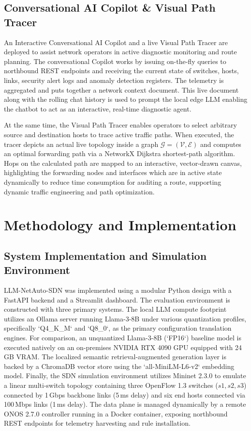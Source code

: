 \documentclass[conference]{IEEEtran}
\begin{document}
\subsection{Conversational AI Copilot \& Visual Path Tracer}
An Interactive Conversational AI Copilot and a live Visual Path Tracer are deployed to assist network operators in active diagnostic monitoring and route planning. The conversational Copilot works by issuing on-the-fly queries to northbound REST endpoints and receiving the current state of switches, hosts, links, security alert logs and anomaly detection registers. The telemetry is aggregated and puts together a network context document. This live document along with the rolling chat history is used to prompt the local edge LLM enabling the chatbot to act as an interactive, real-time diagnostic agent.

At the same time, the Visual Path Tracer enables operators to select arbitrary source and destination hosts to trace active traffic paths. When executed, the tracer depicts an actual live topology inside a graph $\mathcal{G} = (\mathcal{V}, \mathcal{E})$ and computes an optimal forwarding path via a NetworkX Dijkstra shortest-path algorithm. Hops on the calculated path are mapped to an interactive, vector-drawn canvas, highlighting the forwarding nodes and interfaces which are in active state dynamically to reduce time consumption for auditing a route, supporting dynamic traffic engineering and path optimization.

\section{Methodology and Implementation}

\subsection{System Implementation and Simulation Environment}
LLM-NetAuto-SDN was implemented using a modular Python design with a FastAPI backend and a Streamlit dashboard. The evaluation environment is constructed with three primary systems. The local LLM compute footprint utilizes an Ollama server running Llama-3-8B under various quantization profiles, specifically `Q4\_K\_M` and `Q8\_0`, as the primary configuration translation engines. For comparison, an unquantized Llama-3-8B (`FP16`) baseline model is executed natively on an on-premises NVIDIA RTX 4090 GPU equipped with 24\,GB VRAM. The localized semantic retrieval-augmented generation layer is backed by a ChromaDB vector store using the `all-MiniLM-L6-v2` embedding model. Finally, the SDN simulation environment utilizes Mininet 2.3.0 to emulate a linear multi-switch topology containing three OpenFlow 1.3 switches ($s1, s2, s3$) connected by 1\,Gbps backbone links (5\,ms delay) and six end hosts connected via 100\,Mbps links (1\,ms delay). The data plane is managed dynamically by a remote ONOS 2.7.0 controller running in a Docker container, exposing northbound REST endpoints for telemetry harvesting and rule installation.
\end{document}
